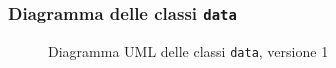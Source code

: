 \subsubsection{Diagramma delle classi \texttt{data}}
\vspace{0.5cm}
\begin{figure}[H]
    \centering
    \caption{Diagramma UML delle classi \texttt{data}, versione 1}
    \label{fig:class_data_v_1}
\end{figure}